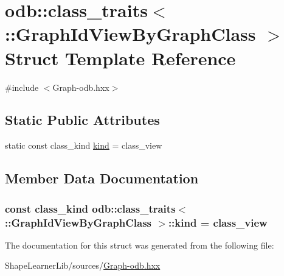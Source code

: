 \hypertarget{structodb_1_1class__traits_3_01_1_1_graph_id_view_by_graph_class_01_4}{}\section{odb\+:\+:class\+\_\+traits$<$ \+:\+:Graph\+Id\+View\+By\+Graph\+Class $>$ Struct Template Reference}
\label{structodb_1_1class__traits_3_01_1_1_graph_id_view_by_graph_class_01_4}


{\ttfamily \#include $<$Graph-\/odb.\+hxx$>$}

\subsection*{Static Public Attributes}
\begin{DoxyCompactItemize}
\item 
static const class\+\_\+kind \hyperlink{structodb_1_1class__traits_3_01_1_1_graph_id_view_by_graph_class_01_4_a64aaf65edb5a93cf32052e1dfaa4b9a2}{kind} = class\+\_\+view
\end{DoxyCompactItemize}


\subsection{Member Data Documentation}
\hypertarget{structodb_1_1class__traits_3_01_1_1_graph_id_view_by_graph_class_01_4_a64aaf65edb5a93cf32052e1dfaa4b9a2}{}
\subsubsection[{kind}]{\setlength{\rightskip}{0pt plus 5cm}const class\+\_\+kind odb\+::class\+\_\+traits$<$ \+::{\bf Graph\+Id\+View\+By\+Graph\+Class} $>$\+::kind = class\+\_\+view\hspace{0.3cm}{\ttfamily [static]}}\label{structodb_1_1class__traits_3_01_1_1_graph_id_view_by_graph_class_01_4_a64aaf65edb5a93cf32052e1dfaa4b9a2}


The documentation for this struct was generated from the following file\+:\begin{DoxyCompactItemize}
\item 
Shape\+Learner\+Lib/sources/\hyperlink{_graph-odb_8hxx}{Graph-\/odb.\+hxx}\end{DoxyCompactItemize}

